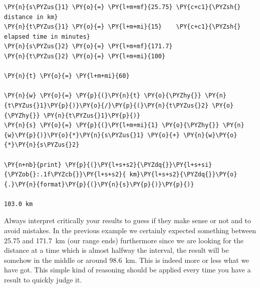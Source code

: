 \begin{codebox}
\begin{Verbatim}[commandchars=\\\{\}]
\PY{n}{s\PYZus{}1} \PY{o}{=} \PY{l+m+mf}{25.75} \PY{c+c1}{\PYZsh{} distance in km}
\PY{n}{t\PYZus{}1} \PY{o}{=} \PY{l+m+mi}{15}    \PY{c+c1}{\PYZsh{} elapsed time in minutes}
\PY{n}{s\PYZus{}2} \PY{o}{=} \PY{l+m+mf}{171.7}
\PY{n}{t\PYZus{}2} \PY{o}{=} \PY{l+m+mi}{100}

\PY{n}{t} \PY{o}{=} \PY{l+m+mi}{60}

\PY{n}{w} \PY{o}{=} \PY{p}{(}\PY{n}{t} \PY{o}{\PYZhy{}} \PY{n}{t\PYZus{}1}\PY{p}{)}\PY{o}{/}\PY{p}{(}\PY{n}{t\PYZus{}2} \PY{o}{\PYZhy{}} \PY{n}{t\PYZus{}1}\PY{p}{)}
\PY{n}{s} \PY{o}{=} \PY{p}{(}\PY{l+m+mi}{1} \PY{o}{\PYZhy{}} \PY{n}{w}\PY{p}{)}\PY{o}{*}\PY{n}{s\PYZus{}1} \PY{o}{+} \PY{n}{w}\PY{o}{*}\PY{n}{s\PYZus{}2}

\PY{n+nb}{print} \PY{p}{(}\PY{l+s+s2}{\PYZdq{}}\PY{l+s+si}{\PYZob{}:.1f\PYZcb{}}\PY{l+s+s2}{ km}\PY{l+s+s2}{\PYZdq{}}\PY{o}{.}\PY{n}{format}\PY{p}{(}\PY{n}{s}\PY{p}{)}\PY{p}{)}

103.0 km
\end{Verbatim}
\end{codebox}

Always interpret critically your results to guess if they make sense or not and to avoid mistakes. In the previous example we certainly expected something between 25.75 and 171.7~km (our range ends) furthermore since we are looking for the distance at a time which is almost halfway the interval, the result will be somehow in the middle or around 98.6~km. This is indeed more or less what we have got.
This simple kind of reasoning should be applied every time you have a result to quickly judge it.

